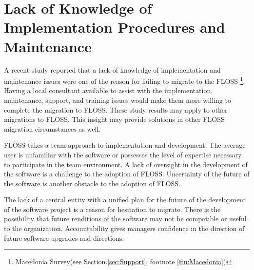   \section{Lack of Knowledge of Implementation Procedures and Maintenance}

  A recent study reported that a lack of knowledge of implementation and maintenance issues were one of the reason for failing to migrate to the FLOSS \footnote{Macedonia Survey(see Section.\ref{sec:Support}, footnote \ref{ftn:Macedonia})}. 
  Having a local consultant available to assist with the implementation, maintenance, support, and training issues would make them more willing to complete the migration to FLOSS. These study results may apply to other migrations to FLOSS. This insight may provide solutions in other FLOSS migration circumstances as well.  

  FLOSS takes a team approach to implementation and development. The average user is unfamiliar with the software or possesses the level of expertise necessary to participate in the team environment.
  A lack of oversight in the development of the software is a challenge to the adoption of FLOSS. Uncertainty of the future of the software is another obstacle to the adoption of FLOSS. 

  The lack of a central entity with a unified plan for the future of the development of the software project is a reason for hesitation to migrate.
  There is the possibility that future renditions of the software may not be compatible or useful to the organization.
  Accountability gives managers confidence in the direction of future software upgrades and directions. 
 

